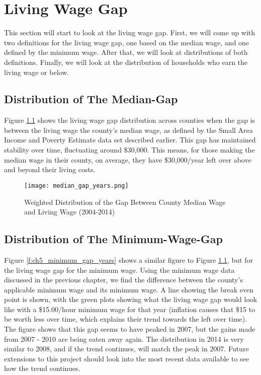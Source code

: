 \chapter{Living Wage Gap}\label{ch:living_wage_gap}

This section will start to look at the living wage gap. First, we will come up with two definitions for the living wage gap, one based on the median wage, and one defined by the minimum wage. After that, we will look at distributions of both definitions. Finally, we will look at the distribution of households who earn the living wage or below.

\section{Distribution of The Median-Gap}

Figure \ref{f:ch5_median_gap_years} shows the living wage gap distribution across counties when the gap is between the living wage the county's median wage, as defined by the Small Area Income and Poverty Estimate data set described earlier. This gap has maintained stability over time, fluctuating around \$30,000. This means, for those making the median wage in their county, on average, they have \$30,000/year left over above and beyond their living costs.

\begin{figure}[H]
    \centering
        \texttt{[image: median\_gap\_years.png]}
        \caption{Weighted Distribution of the Gap Between County Median Wage and Living Wage (2004-2014)}
    \label{f:ch5_median_gap_years}
\end{figure}



\section{Distribution of The Minimum-Wage-Gap}

Figure \ref{f:ch5_minimum_gap_years} shows a similar figure to Figure \ref{f:ch5_median_gap_years}, but for the living wage gap for the minimum wage. Using the minimum wage data discussed in the previous chapter, we find the difference between the county's applicable minimum wage and its minimum wage. A line showing the break even point is shown, with the green plots showing what the living wage gap would look like with a \$15.00/hour minimum wage for that year (inflation causes that \$15 to be worth less over time, which explains their trend towards the left over time). The figure shows that this gap seems to have peaked in 2007, but the gains made from 2007 - 2010 are being eaten away again. The distribution in 2014 is very similar to 2008, and if the trend continues, will match the peak in 2007. Future extensions to this project should look into the most recent data available to see how the trend continues.

